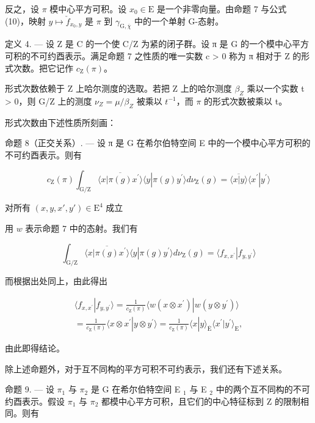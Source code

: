 反之，设 \(\pi\) 模中心平方可积。设 \(x_0 \in \mathrm{E}\) 是一个非零向量。由命题 7 与公式 (10)，映射 \(y \mapsto \check{f}_{x_0,y}\) 是 \(\pi\) 到 \(\gamma_{\mathrm{G},\overline{\chi}}\) 中的一个单射 G-态射。

定义 4. --- 设 Z 是 C 的一个使 C/Z 为紧的闭子群。设 π 是 G 的一个模中心平方可积的不可约酉表示。满足命题 7 之性质的唯一实数 c \textgreater{} 0 称为 π 相对于 Z 的形式次数。把它记作 \(c_{\mathrm{Z}}(\pi)\)。

形式次数依赖于 Z 上哈尔测度的选取。若把 Z 上的哈尔测度 \(\beta_{Z}\) 乘以一个实数 t \textgreater{} 0，则 G/Z 上的测度 \(\nu_{Z} = \mu/\beta_{Z}\) 被乘以 \(t^{-1}\)，而 \(\pi\) 的形式次数被乘以 t。

形式次数由下述性质所刻画：

命题 8（正交关系）. --- 设 π 是 G 在希尔伯特空间 E 中的一个模中心平方可积的不可约酉表示。则有

\[
c _ {\mathrm{Z}} (\pi) \int_ {\mathrm{G} / \mathrm{Z}} \overline {{\langle x | \pi (g) x ^ {\prime} \rangle}} \langle y | \pi (g) y ^ {\prime} \rangle d \nu_ {\mathrm{Z}} (g) = \overline {{\langle x | y \rangle}} \langle x ^ {\prime} | y ^ {\prime} \rangle
\]

对所有 \((x,y,x',y')\in \mathrm{E}^4\) 成立

用 \(w\) 表示命题 7 中的态射。我们有

\[
\int_ {\mathrm{G} / \mathrm{Z}} \overline {{\langle x | \pi (g) x ^ {\prime} \rangle}} \langle y | \pi (g) y ^ {\prime} \rangle d \nu_ {\mathrm{Z}} (g) = \langle f _ {x, x ^ {\prime}} | f _ {y, y ^ {\prime}} \rangle
\]

而根据出处同上，由此得出

\[
\begin{array}{c} \langle f _ {x, x ^ {\prime}} | f _ {y, y ^ {\prime}} \rangle = \frac {1}{c _ {\mathrm{Z}} (\pi)} \langle w (x \otimes x ^ {\prime}) | w (y \otimes y ^ {\prime}) \rangle \\ = \frac {1}{c _ {\mathrm{Z}} (\pi)} \langle x \otimes x ^ {\prime} | y \otimes y ^ {\prime} \rangle = \frac {1}{c _ {\mathrm{Z}} (\pi)} \langle x | y \rangle_ {\overline {{\mathrm{E}}}} \langle x ^ {\prime} | y ^ {\prime} \rangle_ {\mathrm{E}}, \end{array}
\]

由此即得结论。

除上述命题外，对于互不同构的平方可积不可约表示，我们还有下述关系。

命题 9. --- 设 \(\pi_1\) 与 \(\pi_2\) 是 G 在希尔伯特空间 E \(_1\) 与 E \(_2\) 中的两个互不同构的不可约酉表示。假设 \(\pi_1\) 与 \(\pi_2\) 都模中心平方可积，且它们的中心特征标到 Z 的限制相同。则有

